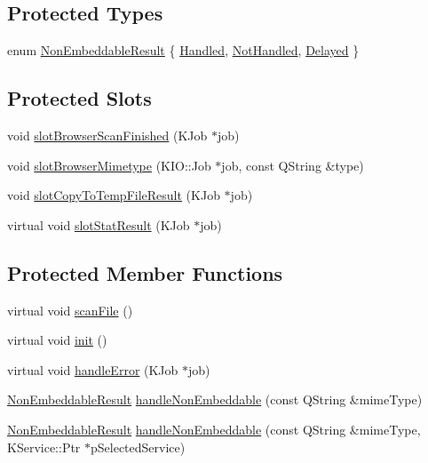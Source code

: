 \subsection*{\-Protected \-Types}
\begin{DoxyCompactItemize}
\item 
enum \hyperlink{classKParts_1_1BrowserRun_af7f4f75d5ab28c3183f9f5ee96b8a79f}{\-Non\-Embeddable\-Result} \{ \hyperlink{classKParts_1_1BrowserRun_af7f4f75d5ab28c3183f9f5ee96b8a79fa1489069cb381b59c2de0d501e347388e}{\-Handled}, 
\hyperlink{classKParts_1_1BrowserRun_af7f4f75d5ab28c3183f9f5ee96b8a79fae968cb6de73d4c96f7644a55adf610ca}{\-Not\-Handled}, 
\hyperlink{classKParts_1_1BrowserRun_af7f4f75d5ab28c3183f9f5ee96b8a79fa7a4f366bf6b4319caab0e48610f5e26c}{\-Delayed}
 \}
\end{DoxyCompactItemize}
\subsection*{\-Protected \-Slots}
\begin{DoxyCompactItemize}
\item 
void \hyperlink{classKParts_1_1BrowserRun_abed6cac6df3f2147be76a0524e92ddc1}{slot\-Browser\-Scan\-Finished} (\-K\-Job $\ast$job)
\item 
void \hyperlink{classKParts_1_1BrowserRun_a549306dfbb92c12c97a1663b82d93a51}{slot\-Browser\-Mimetype} (\-K\-I\-O\-::\-Job $\ast$job, const \-Q\-String \&type)
\item 
void \hyperlink{classKParts_1_1BrowserRun_a43d7f0c6a27c25ba93d6085162574d7e}{slot\-Copy\-To\-Temp\-File\-Result} (\-K\-Job $\ast$job)
\item 
virtual void \hyperlink{classKParts_1_1BrowserRun_a27fc9f400c6eccf2188d5899550af89a}{slot\-Stat\-Result} (\-K\-Job $\ast$job)
\end{DoxyCompactItemize}
\subsection*{\-Protected \-Member \-Functions}
\begin{DoxyCompactItemize}
\item 
virtual void \hyperlink{classKParts_1_1BrowserRun_a78858ebd1b73ece426abc128edf4e4e5}{scan\-File} ()
\item 
virtual void \hyperlink{classKParts_1_1BrowserRun_a6140fdc2848021232a3c84a5df98b130}{init} ()
\item 
virtual void \hyperlink{classKParts_1_1BrowserRun_a2b961dffc73904a1b7fde816a49bb05f}{handle\-Error} (\-K\-Job $\ast$job)
\item 
\hyperlink{classKParts_1_1BrowserRun_af7f4f75d5ab28c3183f9f5ee96b8a79f}{\-Non\-Embeddable\-Result} \hyperlink{classKParts_1_1BrowserRun_ad1b275632b2bc76378879a15ac548706}{handle\-Non\-Embeddable} (const \-Q\-String \&mime\-Type)
\item 
\hyperlink{classKParts_1_1BrowserRun_af7f4f75d5ab28c3183f9f5ee96b8a79f}{\-Non\-Embeddable\-Result} \hyperlink{classKParts_1_1BrowserRun_a7fbb390d0f47884e704ebe77f5148808}{handle\-Non\-Embeddable} (const \-Q\-String \&mime\-Type, \-K\-Service\-::\-Ptr $\ast$p\-Selected\-Service)
\end{DoxyCompactItemize}


